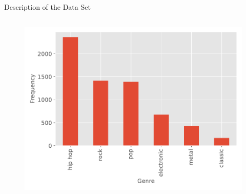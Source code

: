 \begin{frame}{Description of the Data Set}
\begin{columns}[t]
\begin{column}{0.7\textwidth}
\begin{figure}
                \includegraphics[width=\textwidth]{../figures/genre_hist.pdf}
            \end{figure}
        \end{column}
    \end{columns}
\end{frame}